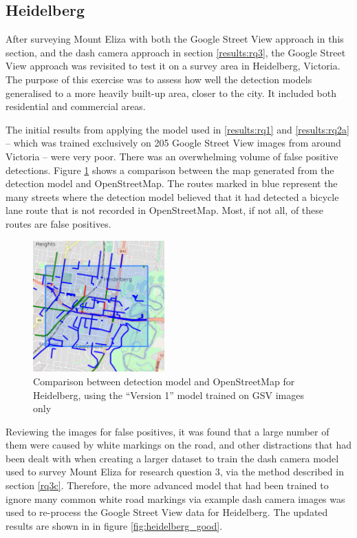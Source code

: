 \documentclass[11pt,twoside]{report}
\begin{document}
\subsection{Heidelberg}

After surveying Mount Eliza with both the Google Street View approach in this section, and the dash camera approach in section \ref{results:rq3}, the Google Street View approach was revisited to test it on a survey area in Heidelberg, Victoria.  The purpose of this exercise was to assess how well the detection models generalised to a more heavily built-up area, closer to the city.  It included both residential and commercial areas.

The initial results from applying the model used in \ref{results:rq1} and \ref{results:rq2a} -- which was trained exclusively on 205 Google Street View images from around Victoria -- were very poor.  There was an overwhelming volume of false positive detections.  Figure \ref{fig:heidelberg_bad} shows a comparison between the map generated from the detection model and OpenStreetMap.  The routes marked in blue represent the many streets where the detection model believed that it had detected a bicycle lane route that is not recorded in OpenStreetMap.  Most, if not all, of these routes are false positives.

\begin{figure}[t!]
\centering
\includegraphics[width=0.45\textwidth]{h_map1_4.png}
\caption{Comparison between detection model and OpenStreetMap for Heidelberg, using the ``Version 1'' model trained on GSV images only}
\label{fig:heidelberg_bad}
\end{figure}

Reviewing the images for false positives, it was found that a large number of them were caused by white markings on the road, and other distractions that had been dealt with when creating a larger dataset to train the dash camera model used to survey Mount Eliza for research question 3, via the method described in section \ref{rq3c}.  Therefore, the more advanced model that had been trained to ignore many common white road markings via example dash camera images was used to re-process the Google Street View data for Heidelberg.  The updated results are shown in in figure \ref{fig:heidelberg_good}.
\end{document}
